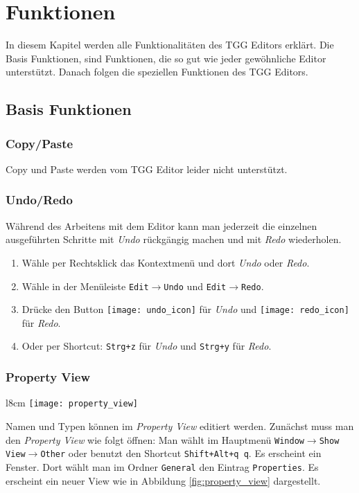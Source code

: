 \chapter{Funktionen}\label{chap:kommandos}

In diesem Kapitel werden alle Funktionalitäten des TGG Editors erklärt. Die Basis Funktionen, sind Funktionen, die so gut wie jeder gewöhnliche Editor unterstützt. Danach folgen die speziellen Funktionen des TGG Editors.

\section{Basis Funktionen}
\subsection{Copy/Paste}
Copy und Paste werden vom TGG Editor leider nicht unterstützt.

\subsection{Undo/Redo}
Während des Arbeitens mit dem Editor kann man jederzeit die einzelnen ausgeführten Schritte mit \emph{Undo} rückgängig machen und mit \emph{Redo} wiederholen.
\begin{enumerate}
	\item Wähle per Rechtsklick das Kontextmenü und dort \emph{Undo} oder \emph{Redo}.
	\item Wähle in der Menüleiste \texttt{Edit}$\rightarrow$\texttt{Undo} und \texttt{Edit}$\rightarrow$\texttt{Redo}.
	\item Drücke den Button \texttt{[image: undo\_icon]} für \emph{Undo} und \texttt{[image: redo\_icon]} für \emph{Redo}.
	\item Oder per Shortcut: \texttt{Strg+z} für \emph{Undo} und \texttt{Strg+y} für \emph{Redo}.
\end{enumerate}

\subsection{Property View}
\begin{wrapfigure}{l}{8cm}
	\centering
	\texttt{[image: property\_view]}
	\caption{Property View}
	\label{fig:property_view}
\end{wrapfigure}
Namen und Typen können im \emph{Property View} editiert werden. Zunächst muss man den \emph{Property View} wie folgt öffnen: Man wählt im Hauptmenü \texttt{Window}$\rightarrow$\texttt{Show View}$\rightarrow$\texttt{Other} oder benutzt den Shortcut \texttt{Shift+Alt+q q}. Es erscheint ein Fenster. Dort wählt man im Ordner \texttt{General} den Eintrag \texttt{Properties}. Es erscheint ein neuer View wie in Abbildung \ref{fig:property_view} dargestellt.

